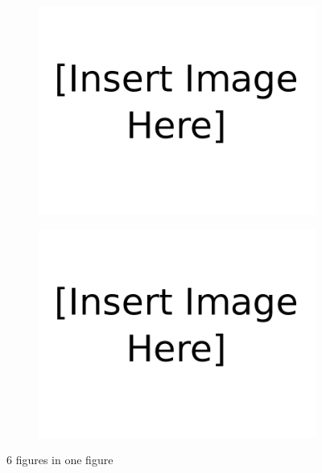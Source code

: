 \begin{figure}[H]
        \begin{subfigure}[b]{0.48\textwidth}   
            \centering 
            \includegraphics[width=\textwidth]{figures/Insert_image_here.png}
            \caption{}    
            \label{fig:test5}
        \end{subfigure}
        \hfill
        \begin{subfigure}[b]{0.48\textwidth}   
            \centering 
            \includegraphics[width=\textwidth]{figures/Insert_image_here.png}
            \caption{}   
            \label{fig:test6}
        \end{subfigure}
        \caption{6 figures in one figure}
        \label{fig:Test 6 figures}
    \end{figure}



